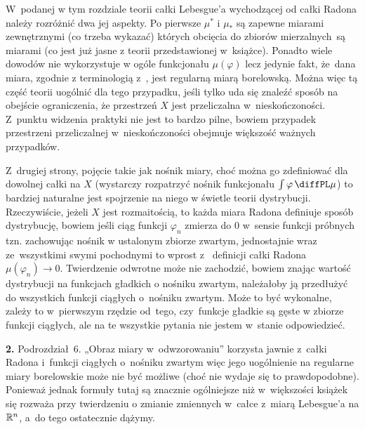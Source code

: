 \documentclass[a4paper,11pt]{article}
\begin{document}
\vspace{\spaceThree}

\start W~podanej w tym rozdziale teorii całki Lebesgue’a wychodzącej
od całki Radona należy rozróżnić dwa jej aspekty. Po pierwsze
$\mu^{ * }$ i $\mu_{ * }$ są zapewne miarami zewnętrznymi (co trzeba
wykazać) których obcięcia do zbiorów mierzalnych~są miarami (co jest
już jasne z teorii przedstawionej w~książce). Ponadto wiele dowodów
nie wykorzystuje w ogóle funkcjonału $\mu( \varphi )$ lecz jedynie fakt,
że~dana miara, zgodnie z terminologią z~\cite{RudinAnalizaRzeczywistaIZespolona1998}, jest regularną
miarą borelowską. Można więc tą część teorii uogólnić dla tego
przypadku, jeśli tylko uda się znaleźć sposób na obejście
ograniczenia, że przestrzeń $X$ jest przeliczalna w~nieskończoności.
Z~punktu widzenia praktyki nie jest to bardzo pilne, bowiem przypadek
przestrzeni przeliczalnej w~nieskończoności obejmuje większość ważnych
przypadków.

Z~drugiej strony, pojęcie takie jak nośnik miary, choć można go
zdefiniować dla dowolnej całki na $X$ (wystarczy rozpatrzyć nośnik
funkcjonału $\int \varphi \, \diffPL \mu$) to bardziej naturalne jest
spojrzenie na niego w świetle teorii dystrybucji. Rzeczywiście, jeżeli
$X$ jest rozmaitością, to każda miara Radona definiuje sposób
dystrybucję, bowiem jeśli ciąg funkcji $\varphi_{ n }$ zmierza do 0
w~sensie funkcji próbnych tzn. zachowując nośnik w ustalonym zbiorze
zwartym, jednostajnie wraz ze~wszystkimi swymi pochodnymi to wprost z~
definicji całki Radona $\mu( \varphi_{ n } ) \to 0$. Twierdzenie odwrotne
może nie zachodzić, bowiem znając wartość dystrybucji na funkcjach
gładkich o nośniku zwartym, należałoby ją przedłużyć do wszystkich
funkcji ciągłych o~nośniku zwartym. Może to być wykonalne, zależy to
w~pierwszym rzędzie od~tego, czy~funkcje gładkie są gęste w zbiorze
funkcji ciągłych, ale na te wszystkie pytania nie jestem w~stanie
odpowiedzieć.

\vspace{\spaceFour}


\start \textbf{2.} Podrozdział~6. „Obraz miary w~odwzorowaniu”
korzysta jawnie z~całki Radona i~funkcji ciągłych o~nośniku zwartym
więc jego uogólnienie na regularne miary borelowskie może nie być
możliwe (choć nie wydaje się to prawdopodobne). Ponieważ jednak
formuły tutaj są znacznie ogólniejsze niż w~większości książek się
rozważa przy twierdzeniu o zmianie zmiennych w~całce z~miarą
Lebesgue’a na $\mathbb{R}^{ n }$, a~do tego ostatecznie dążymy.

\vspace{\spaceFour}
\end{document}
